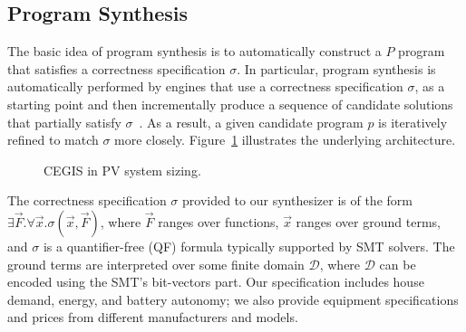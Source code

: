\documentclass[journal]{IEEEtran}
\begin{document}
\subsection{Program Synthesis}
The basic idea of program synthesis is to automatically construct a $P$ program that satisfies a correctness specification $\sigma$. In particular, program synthesis is automatically performed by engines that use a correctness specification $\sigma$, as a starting point and then incrementally produce a sequence of candidate solutions that partially satisfy $\sigma$~\cite{Abateetal2017}. As a result, a given candidate program $p$ is iteratively refined to match $\sigma$ more closely. Figure~\ref{Counter-Example-Guided-Inductive-Synthesis} illustrates the underlying architecture. 
%
\begin{figure}[ht]
\begin{center}
\end{center}
	\caption{CEGIS in PV system sizing.}
	\label{Counter-Example-Guided-Inductive-Synthesis}
\end{figure}

The correctness specification $\sigma$ provided to our synthesizer is of the form $\exists \vec{F}. \forall \vec{x}. \sigma(\vec{x}, \vec{F})$, where $\vec{F}$ ranges over functions, $\vec{x}$ ranges over ground terms, and $\sigma$ is a quantifier-free (QF) formula typically supported by SMT solvers. The ground terms are interpreted over some finite domain $\mathcal{D}$, where $\mathcal{D}$ can be encoded using the SMT's bit-vectors part. Our specification includes house demand, energy, and battery autonomy; we also provide equipment specifications and prices from different manufacturers and models.
\end{document}
